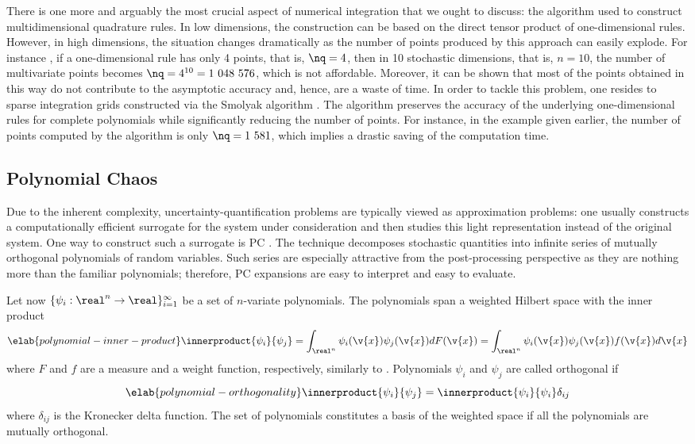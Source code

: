 There is one more and arguably the most crucial aspect of numerical integration
that we ought to discuss: the algorithm used to construct multidimensional
quadrature rules. In low dimensions, the construction can be based on the direct
tensor product of one-dimensional rules. However, in high dimensions, the
situation changes dramatically as the number of points produced by this approach
can easily explode. For instance \cite{heiss2008}, if a one-dimensional rule has
only 4 points, that is, $\nq = 4$, then in 10 stochastic dimensions, that is, $n
= 10$, the number of multivariate points becomes $\nq = 4^{10} = 1~048~576$,
which is not affordable. Moreover, it can be shown that most of the points
obtained in this way do not contribute to the asymptotic accuracy and, hence,
are a waste of time. In order to tackle this problem, one resides to sparse
integration grids constructed via the Smolyak algorithm \cite{burkardt,
eldred2008, heiss2008}. The algorithm preserves the accuracy of the underlying
one-dimensional rules for complete polynomials while significantly reducing the
number of points. For instance, in the example given earlier, the number of
points computed by the algorithm is only $\nq = 1~581$, which implies a drastic
saving of the computation time.

\subsection{Polynomial Chaos}

Due to the inherent complexity, uncertainty-quantification problems are
typically viewed as approximation problems: one usually constructs a
computationally efficient surrogate for the system under consideration and then
studies this light representation instead of the original system. One way to
construct such a surrogate is \ac{PC} \cite{xiu2010}. The technique decomposes
stochastic quantities into infinite series of mutually orthogonal polynomials of
random variables. Such series are especially attractive from the post-processing
perspective as they are nothing more than the familiar polynomials; therefore,
\ac{PC} expansions are easy to interpret and easy to evaluate.

Let now $\{ \psi_i: \real^n \to \real \}_{i = 1}^\infty$ be a set of $n$-variate
polynomials. The polynomials span a weighted Hilbert space with the inner
product
\begin{equation} \elab{polynomial-inner-product}
  \innerproduct{\psi_i}{\psi_j}
  = \int_{\real^n} \psi_i(\v{x}) \psi_j(\v{x}) dF(\v{x})
  = \int_{\real^n} \psi_i(\v{x}) \psi_j(\v{x}) f(\v{x}) d\v{x}
\end{equation}
where $F$ and $f$ are a measure and a weight function, respectively, similarly
to . Polynomials $\psi_i$ and $\psi_j$ are called
orthogonal if
\begin{equation} \elab{polynomial-orthogonality}
  \innerproduct{\psi_i}{\psi_j} = \innerproduct{\psi_i}{\psi_i} \delta_{ij}
\end{equation}
where $\delta_{ij}$ is the Kronecker delta function. The set of polynomials
constitutes a basis of the weighted space if all the polynomials are mutually
orthogonal.

